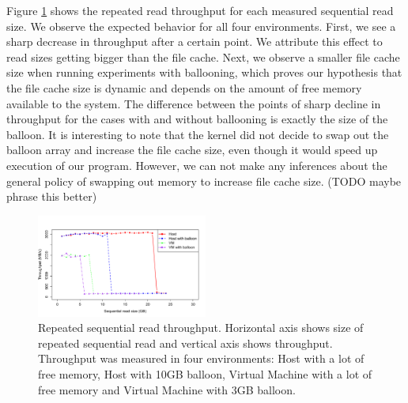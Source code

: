 Figure \ref{fig:p3graph} shows the repeated read throughput for each measured sequential read size. We observe the expected behavior for all four environments. First, we see a sharp decrease in throughput after a certain point. We attribute this effect to read sizes getting bigger than the file cache. Next, we observe a smaller file cache size when running experiments with ballooning, which proves our hypothesis that the file cache size is dynamic and depends on the amount of free memory available to the system. The difference between the points of sharp decline in throughput for the cases with and without ballooning is exactly the size of the balloon. It is interesting to note that the kernel did not decide to swap out the balloon array and increase the file cache size, even though it would speed up execution of our program. However, we can not make any inferences about the general policy of swapping out memory to increase file cache size. (TODO maybe phrase this better)

\begin{figure}[ht!]
	\includegraphics[width=0.5\textwidth]{./figures/p3.pdf}
	\caption{Repeated sequential read throughput. Horizontal axis shows size of repeated sequential read and vertical axis shows throughput. Throughput was measured in four environments: Host with a lot of free memory, Host with 10GB balloon, Virtual Machine with a lot of free memory and Virtual Machine with 3GB balloon.}
	\label{fig:p3graph}
\end{figure}
